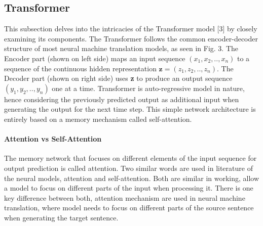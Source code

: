 \documentclass[conference]{IEEEtran}
\begin{document}
\subsection{Transformer}\label{AA}
This subsection delves into the intricacies of the Transformer model [3] by closely examining its components. The Transformer follows the common encoder-decoder structure of most neural machine translation models, as seen in Fig. 3. The Encoder part (shown on left side) maps
an input sequence \((x_1, x_2, .., x_n)\) to a sequence of the continuous hidden representation \(\textbf{z} = (z_1, z_2, .., z_n)\). The Decoder part (shown on right side) uses \textbf{z} to produce an output sequence
\((y_1, y_2,.., y_n)\) one at a time. Transformer is auto-regressive
model in nature, hence considering the previously predicted
output as additional input when generating the output for the next
time step. This simple network architecture is entirely based on
a memory mechanism called self-attention.

\paragraph{\textbf{Attention vs Self-Attention}}
The memory network that focuses on different elements of the input sequence for output prediction  is called attention. Two similar words are used in literature of the neural models, attention
and self-attention. Both are similar in working, allow a model
to focus on different parts of the input when processing it.
There is one key difference between both, attention mechanism
are used in neural machine translation, where model needs to
focus on different parts of the source sentence when generating
the target sentence.
\end{document}
